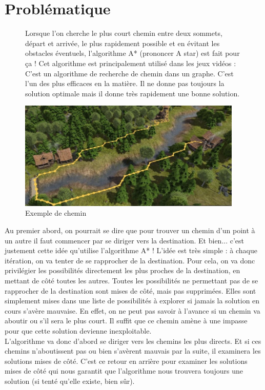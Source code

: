 

\section{Problématique}




\begin{figure}[!h]
\begin{minipage}{0.6\textwidth}
Lorsque l'on cherche le plus court chemin entre deux sommets, départ et arrivée, le plus rapidement possible et en évitant les obstacles éventuels, l'algorithme A* (prononcer A star) est fait pour ça ! Cet algorithme est principalement utilisé dans les jeux vidéos :
C'est un algorithme de recherche de chemin dans un graphe. C'est l'un des plus efficaces en la matière. Il ne donne pas toujours la solution optimale mais il donne très rapidement une bonne solution.\\
\end{minipage}
\begin{minipage}{0.4\textwidth}
\begin{center}
\includegraphics[width=0.95\textwidth]{images/jeuVideo.jpg}
\caption{Exemple de chemin}
\end{center}
\end{minipage}
\end{figure}


Au premier abord, on pourrait se dire que pour trouver un chemin d'un point à un autre il faut commencer par se diriger vers la destination. Et bien... c'est justement cette idée qu'utilise l'algorithme A* ! L'idée est très simple : à chaque itération, on va tenter de se rapprocher de la destination. Pour cela, on va donc privilégier les possibilités directement les plus proches de la destination, en mettant de côté toutes les autres. Toutes les possibilités ne permettant pas de se rapprocher de la destination sont mises de côté, mais pas supprimées. Elles
sont simplement mises dans une liste de possibilités à explorer si jamais la solution en cours s'avère mauvaise.
En effet, on ne peut pas savoir à l'avance si un chemin va aboutir ou s'il sera le plus court. Il suffit que ce chemin amène à une impasse pour que cette solution devienne inexploitable.\\
L'algorithme va donc d'abord se diriger vers les chemins les plus directs. Et si ces chemins n'aboutissent pas ou bien s'avèrent mauvais par la suite, il examinera les solutions mises de côté. C'est ce retour en arrière pour examiner les solutions mises de côté qui nous garantit que l'algorithme nous trouvera toujours une solution (si
tenté qu'elle existe, bien sûr).



